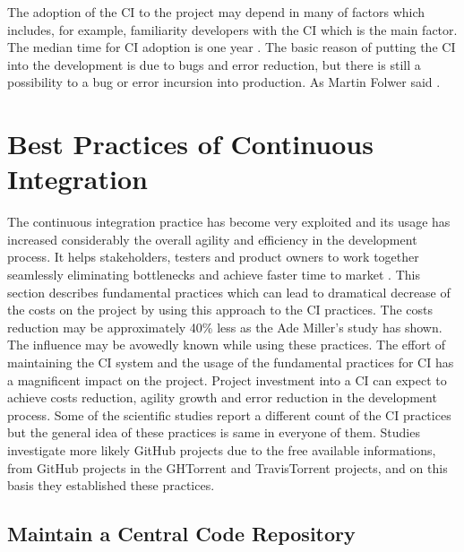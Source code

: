 The adoption of the CI to the project may depend in many of factors which includes, for example, familiarity developers with the CI which is the main factor. The median time for CI adoption is one year \cite{COPE}. The basic reason of putting the CI into the development is due to bugs and error reduction, but there is still a possibility to a bug or error incursion into production. As Martin Folwer said  \cite{MartinFowler}.

\section{Best Practices of Continuous Integration}

The continuous integration practice has become very exploited and its usage has increased considerably the overall agility and efficiency in the development process. It helps stakeholders, testers and product owners to work together seamlessly eliminating bottlenecks and achieve faster time to market \cite{CI-BP1}. This section describes fundamental practices which can lead to dramatical decrease of the costs on the project by using this approach to the CI practices. The costs reduction may be approximately 40\% less as the Ade Miller's study \cite{100DaysOfCI} has shown. The influence may be avowedly known while using these practices. The effort of maintaining the CI system and the usage of the fundamental practices for CI has a magnificent impact on the project. Project investment into a CI can expect to achieve costs reduction, agility growth and error reduction in the development process. Some of the scientific studies report a different count of the CI practices but the general idea of these practices is same in everyone of them. Studies investigate more likely GitHub projects due to the free available informations, from GitHub projects in the GHTorrent and TravisTorrent projects, and on this basis they established these practices.

\subsection{Maintain a Central Code Repository}


